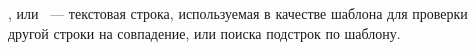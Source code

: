 
, или 
\ --- текстовая строка, используемая в качестве
шаблона для проверки другой строки на совпадение, или поиска подстрок по
шаблону.

